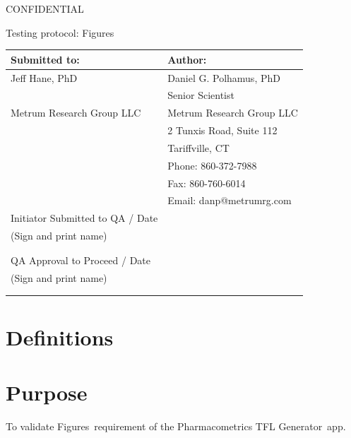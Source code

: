 \documentclass{article}
\newcommand{\tfl}{Pharmacometrics TFL Generator}
\newcommand{\topic}{Figures}
\begin{document}
\begin{center}
{\large CONFIDENTIAL} 


\vspace*{1cm}


\vspace*{1cm}

{\huge Testing protocol: \topic}
\vspace{3.0cm}

\begin{tabular}{|l|l|}\hline
Submitted to: & Author:\\\hline
Jeff Hane, PhD & Daniel G. Polhamus, PhD \\
&Senior Scientist\\
Metrum Research Group LLC & Metrum Research Group LLC\\
 & 2 Tunxis Road, Suite 112\\
  & Tariffville, CT\\
  & Phone: 860-372-7988 \\
 & Fax: 860-760-6014 \\
  & Email: danp@metrumrg.com \\\hline

  Initiator Submitted to QA  / Date & \\
  
 (Sign and print name) & \\
  & \\
  & \\\hline
  
QA Approval to Proceed / Date & \\

 (Sign and print name) & \\
  & \\
 & \\\hline

\end{tabular}

\end{center}

\newpage
\vspace{3in}
\section*{Definitions}


\section*{Purpose}
To validate \topic\ requirement of the \tfl\ app.
\end{document}
